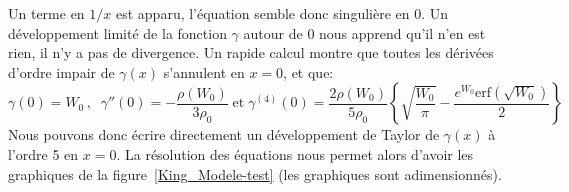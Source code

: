 	Un terme en $1/x$ est apparu, l'équation semble donc singulière en $0$. Un 
	développement limité de la fonction $\gamma$ autour de $0$ nous apprend qu'il n'en est rien, il n'y a
	pas de divergence. Un rapide calcul montre que toutes les dérivées d'ordre impair de $\gamma(x)$ s'annulent en $x=0$, et que:
	$$
	\gamma(0) = W_0\, ,\;\; \gamma''(0) = -\frac{\rho(W_0)}{3\rho_0}\; \mathrm{et}\; \gamma^{(4)}(0) = \frac{2\rho(W_0)}{5\rho_0}\left\{\sqrt{\frac{W_0}{\pi}} -
			\frac{e^{W_0}\mathrm{erf}(\sqrt{W_0})}{2}\right\} 
	$$
	Nous pouvons donc écrire directement un développement de Taylor de $\gamma(x)$ à l'ordre 5 en $x=0$. 
	La résolution des équations nous permet alors d'avoir les graphiques de la
	figure~\ref{King_Modele-test} (les graphiques sont adimensionnés).%


